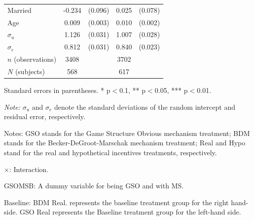 \documentclass[12pt]{article}
\newcommand{\sym}[1]{\rlap{$^{#1}$}}
\begin{document}
\begin{table}[H]
{\begin{tabular}{l*{2}{cc}}
Married     &      -0.234\sym{**} &     (0.096)&       0.025         &     (0.078)\\
Age         &       0.009\sym{***}&     (0.003)&       0.010\sym{***}&     (0.002)\\
$\sigma_u$     &       1.126\sym{***}&     (0.031)&       1.007\sym{***}&     (0.028)\\
$\sigma_e$     &       0.812\sym{***}&     (0.031)&       0.840\sym{***}&     (0.023)\\
\hline
\(n\) (observations)      &        3408         &            &        3702         &            \\
\(N\) (subjects)      &        568         &            &        617         &            \\
\hline\hline
\end{tabular}
}



\begin{tablenotes}
            \footnotesize
            \item Standard errors in parentheses. * p$<$0.1, ** p$<$0.05, *** p$<$0.01.
            \item \textit{Note:} $\sigma_u$ and $\sigma_e$ denote the standard deviations of the random intercept and residual error, respectively.
            \item Notes: GSO stands for the Game Structure Obvious mechanism treatment; BDM stands for the Becker-DeGroot-Marschak mechanism treatment; Real and Hypo stand for the real and hypothetical incentives treatments, respectively.
           \item $\times$: Interaction.
           \item GSOMSB: A dummy variable for being GSO and with MS.
           \item Baseline: BDM Real. represents the baseline treatment group for the right hand-side.
           GSO Real represents the Baseline treatment group for the left-hand side.
        \end{tablenotes}
\end{table}





\clearpage
\end{document}
